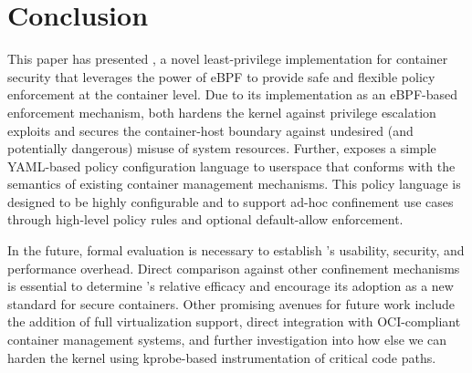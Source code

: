 \section{Conclusion}

This paper has presented \bpfcontain{}, a novel least-privilege implementation for container security that leverages the power of eBPF to provide safe and flexible policy enforcement at the container level. Due to its implementation as an eBPF-based enforcement mechanism, \bpfcontain{} both hardens the kernel against privilege escalation exploits and secures the container-host boundary against undesired (and potentially dangerous) misuse of system resources. Further, \bpfcontain{} exposes a simple YAML-based policy configuration language to userspace that conforms with the semantics of existing container management mechanisms. This policy language is designed to be highly configurable and to support ad-hoc confinement use cases through high-level policy rules and optional default-allow enforcement.

In the future, formal evaluation is necessary to establish \bpfcontain{}'s usability, security, and performance overhead. Direct comparison against other confinement mechanisms is essential to determine \bpfcontain{}'s relative efficacy and encourage its adoption as a new standard for secure containers. Other promising avenues for future work include the addition of full virtualization support, direct integration with OCI-compliant container management systems, and further investigation into how else we can harden the kernel using kprobe-based instrumentation of critical code paths.
